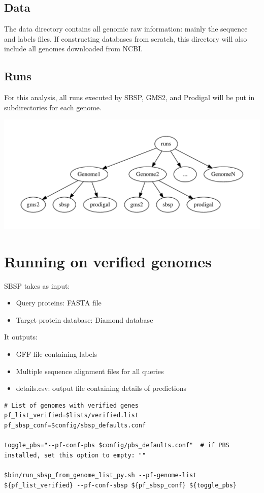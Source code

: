 \documentclass[11pt]{article}
\begin{document}
\subsection{Data}
\label{sec:org690cfb3}
The data directory contains all genomic raw information: mainly the sequence and labels files. If constructing databases from scratch, this directory will also include all genomes downloaded from NCBI.
\subsection{Runs}
\label{sec:org0040d12}
For this analysis, all runs executed by SBSP, GMS2, and Prodigal will be put in subdirectories for each genome. 
\begin{center}
\includegraphics[width=.9\linewidth]{dir_runs.pdf}
\end{center}


\section{Running on verified genomes}
\label{sec:orgc17482e}

SBSP takes as input:
\begin{itemize}
\item Query proteins: FASTA file
\item Target protein database: Diamond database
\end{itemize}

It outputs:
\begin{itemize}
\item GFF file containing labels
\item Multiple sequence alignment files for all queries
\item details.csv: output file containing details of predictions
\end{itemize}



\begin{verbatim}
# List of genomes with verified genes
pf_list_verified=$lists/verified.list
pf_sbsp_conf=$config/sbsp_defaults.conf

toggle_pbs="--pf-conf-pbs $config/pbs_defaults.conf"  # if PBS installed, set this option to empty: ""

$bin/run_sbsp_from_genome_list_py.sh --pf-genome-list ${pf_list_verified} --pf-conf-sbsp ${pf_sbsp_conf} ${toggle_pbs} 

\end{verbatim}
\end{document}
